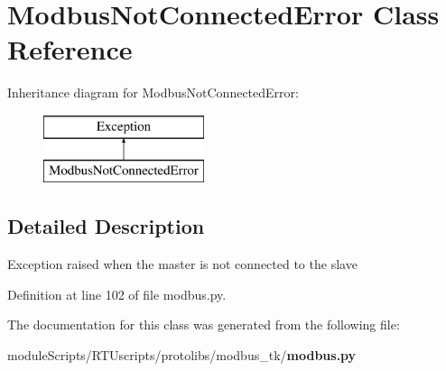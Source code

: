 \section{Modbus\+Not\+Connected\+Error Class Reference}
\label{classprotolibs_1_1modbus__tk_1_1modbus_1_1_modbus_not_connected_error}
Inheritance diagram for Modbus\+Not\+Connected\+Error\+:\begin{figure}[H]
\begin{center}
\leavevmode
\includegraphics[height=2.000000cm]{classprotolibs_1_1modbus__tk_1_1modbus_1_1_modbus_not_connected_error}
\end{center}
\end{figure}


\subsection{Detailed Description}
\begin{DoxyVerb}Exception raised when the master is not connected to the slave 
\end{DoxyVerb}
 

Definition at line 102 of file modbus.\+py.



The documentation for this class was generated from the following file\+:\begin{DoxyCompactItemize}
\item 
module\+Scripts/\+R\+T\+Uscripts/protolibs/modbus\+\_\+tk/{\bf modbus.\+py}\end{DoxyCompactItemize}
